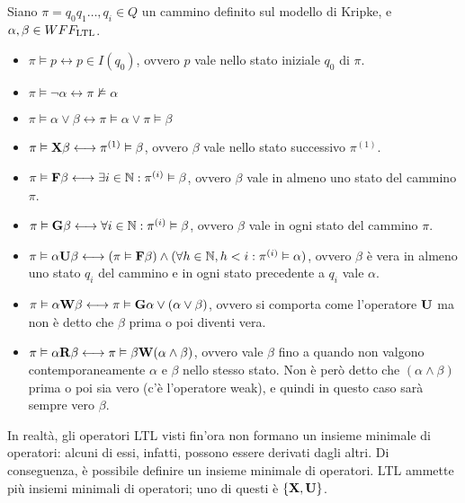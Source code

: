 Siano $\pi = q_0 q_1 \ldots, q_i \in Q$ un cammino definito sul modello di
Kripke, e $\alpha, \beta \in WFF_{\textnormal{LTL}}$.
\begin{itemize}
    \item $\pi \vDash p \longleftrightarrow p \in I(q_0)$, ovvero $p$ vale
    nello stato iniziale $q_0$ di $\pi$.
    \item $\pi \vDash \lnot \alpha \longleftrightarrow \pi \nvDash \alpha$
    \item $\pi \vDash \alpha \lor \beta \longleftrightarrow \pi \vDash \alpha \lor \pi \vDash \beta$
    \item $\pi \vDash \textnormal{\textbf{X}} \beta \longleftrightarrow \pi^{(1)} \vDash \beta$,
    ovvero $\beta$ vale nello stato successivo $\pi^{(1)}$.
    \item $\pi \vDash \textnormal{\textbf{F}} \beta \longleftrightarrow
    \exists i \in \mathbb{N} : \pi^{(i)} \vDash \beta$,
    ovvero $\beta$ vale in almeno uno stato del cammino $\pi$.
    \item $\pi \vDash \textnormal{\textbf{G}} \beta \longleftrightarrow
    \forall i \in \mathbb{N} : \pi^{(i)} \vDash \beta$,
    ovvero $\beta$ vale in ogni stato del cammino $\pi$.
    \item $\pi \vDash \alpha \textnormal{\textbf{U}} \beta \longleftrightarrow
    (\pi \vDash \textnormal{\textbf{F}} \beta) \land
    (\forall h \in \mathbb{N}, h < i : \pi^{(i)} \vDash \alpha)$,
    ovvero $\beta$ è vera in almeno uno stato $q_i$ del cammino e in ogni stato
    precedente a $q_i$ vale $\alpha$.
    \item $\pi \vDash \alpha \textnormal{\textbf{W}} \beta \longleftrightarrow
    \pi \vDash \textnormal{\textbf{G}} \alpha \lor (\alpha \lor \beta)$, ovvero
    si comporta come l'operatore $\textnormal{\textbf{U}}$ ma non è detto che $\beta$ prima
    o poi diventi vera.
    \item $\pi \vDash \alpha \textnormal{\textbf{R}} \beta \longleftrightarrow
    \pi \vDash \beta \textnormal{\textbf{W}} (\alpha \land \beta)$, ovvero vale $\beta$
    fino a quando non valgono contemporaneamente $\alpha$ e $\beta$ nello
    stesso stato. Non è però detto che $(\alpha \land \beta)$ prima o
    poi sia vero (c'è l'operatore weak), e quindi in questo caso
    sarà sempre vero $\beta$.
\end{itemize}

In realtà, gli operatori LTL visti fin'ora non formano un insieme minimale
di operatori: alcuni di essi, infatti, possono essere derivati dagli altri.
Di conseguenza, è possibile definire un insieme minimale di operatori.
LTL ammette più insiemi minimali di operatori; uno di questi è
$\left\{\textnormal{\textbf{X}}, \textnormal{\textbf{U}}\right\}$.

